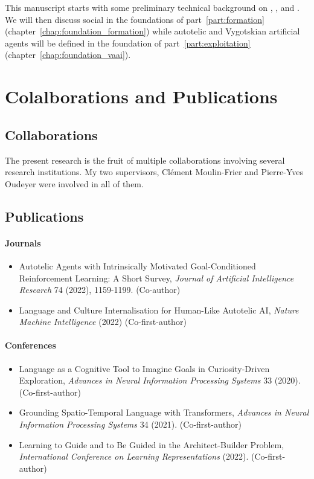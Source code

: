 This manuscript starts with some preliminary technical background on \rl, \il, and \marl. We will then discuss social \marl in the foundations of part~\ref{part:formation} (chapter~\ref{chap:foundation_formation}) while autotelic and Vygotskian artificial agents will be defined in the foundation of part~\ref{part:exploitation} (chapter~\ref{chap:foundation_vaai}). 





\clearpage

\section{Colalborations and Publications}

\subsection{Collaborations}

The present research is the fruit of multiple collaborations involving several research institutions. My two supervisors, Clément Moulin-Frier and Pierre-Yves Oudeyer were involved in all of them.

\subsection{Publications}

\paragraph{Journals}
\begin{itemize}
\item Autotelic Agents with Intrinsically Motivated Goal-Conditioned Reinforcement Learning: A Short Survey, \textit{Journal of Artificial Intelligence Research} 74 (2022), 1159-1199. \cite{colas2021intrinsically} (Co-author)
\item Language and Culture Internalisation for Human-Like Autotelic AI, \textit{Nature Machine Intelligence} (2022) \cite{colas2022language} (Co-first-author)
\end{itemize}

\paragraph{Conferences}

\begin{itemize}
	\item Language as a Cognitive Tool to Imagine Goals in Curiosity-Driven Exploration, \textit{Advances in Neural Information Processing Systems} 33 (2020). \cite{colas2020language} (Co-first-author)
	\item Grounding Spatio-Temporal Language with Transformers, \textit{Advances in Neural Information Processing Systems} 34 (2021). \cite{karch2021grounding} (Co-first-author)
	\item Learning to Guide and to Be Guided in the Architect-Builder Problem, \textit{International Conference on Learning Representations} (2022). \cite{barde2022learning} (Co-first-author)
\end{itemize}

